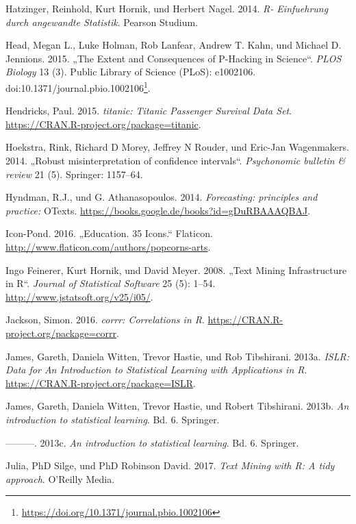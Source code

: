 \documentclass[12pt,ngerman,]{book}
\let\rmarkdownfootnote\footnote%
\def\footnote{\protect\rmarkdownfootnote}
\renewcommand{\href}[2]{#2\footnote{\url{#1}}}
\theoremstyle{definition}
\theoremstyle{definition}
\theoremstyle{remark}
\begin{document}
\hypertarget{ref-Hatzinger}{}
Hatzinger, Reinhold, Kurt Hornik, und Herbert Nagel. 2014. \emph{R-
Einfuehrung durch angewandte Statistik}. Pearson Studium.

\hypertarget{ref-Head2015}{}
Head, Megan L., Luke Holman, Rob Lanfear, Andrew T. Kahn, und Michael D.
Jennions. 2015. „The Extent and Consequences of P-Hacking in Science``.
\emph{PLOS Biology} 13 (3). Public Library of Science (PLoS): e1002106.
doi:\href{https://doi.org/10.1371/journal.pbio.1002106}{10.1371/journal.pbio.1002106}.

\hypertarget{ref-R-titanic}{}
Hendricks, Paul. 2015. \emph{titanic: Titanic Passenger Survival Data
Set}. \url{https://CRAN.R-project.org/package=titanic}.

\hypertarget{ref-hoekstra2014robust}{}
Hoekstra, Rink, Richard D Morey, Jeffrey N Rouder, und Eric-Jan
Wagenmakers. 2014. „Robust misinterpretation of confidence intervals``.
\emph{Psychonomic bulletin \& review} 21 (5). Springer: 1157--64.

\hypertarget{ref-hyndman2014forecasting}{}
Hyndman, R.J., und G. Athanasopoulos. 2014. \emph{Forecasting:
principles and practice:} OTexts.
\url{https://books.google.de/books?id=gDuRBAAAQBAJ}.

\hypertarget{ref-edu_icons}{}
Icon-Pond. 2016. „Education. 35 Icons.`` Flaticon.
\url{http://www.flaticon.com/authors/popcorns-arts}.

\hypertarget{ref-tm}{}
Ingo Feinerer, Kurt Hornik, und David Meyer. 2008. „Text Mining
Infrastructure in R``. \emph{Journal of Statistical Software} 25 (5):
1--54. \url{http://www.jstatsoft.org/v25/i05/}.

\hypertarget{ref-R-corrr}{}
Jackson, Simon. 2016. \emph{corrr: Correlations in R}.
\url{https://CRAN.R-project.org/package=corrr}.

\hypertarget{ref-R-ISLR}{}
James, Gareth, Daniela Witten, Trevor Hastie, und Rob Tibshirani. 2013a.
\emph{ISLR: Data for An Introduction to Statistical Learning with
Applications in R}. \url{https://CRAN.R-project.org/package=ISLR}.

\hypertarget{ref-introstatlearning}{}
James, Gareth, Daniela Witten, Trevor Hastie, und Robert Tibshirani.
2013b. \emph{An introduction to statistical learning}. Bd. 6. Springer.

\hypertarget{ref-james2013introduction}{}
---------. 2013c. \emph{An introduction to statistical learning}. Bd. 6.
Springer.

\hypertarget{ref-tidytextminig}{}
Julia, PhD Silge, und PhD Robinson David. 2017. \emph{Text Mining with
R: A tidy approach}. O'Reilly Media.
\end{document}
